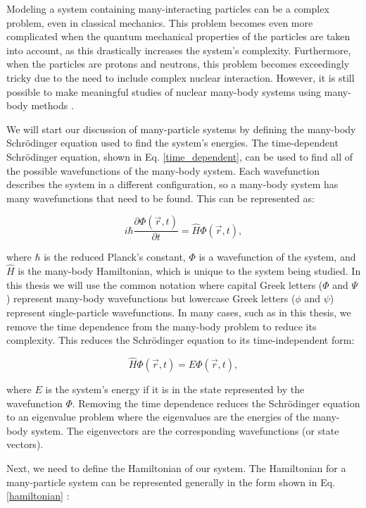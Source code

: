 Modeling a system containing many-interacting particles can be a complex problem, even in classical mechanics. This problem becomes even more complicated when the quantum mechanical properties of the particles are taken into account, as this drastically increases the system's complexity. Furthermore, when the particles are protons and neutrons, this problem becomes exceedingly tricky due to the need to include complex nuclear interaction. However, it is still possible to make meaningful studies of nuclear many-body systems using many-body methods \cite{Ref13}.

We will start our discussion of many-particle systems by defining the many-body Schr\"{o}dinger equation used to find the system's energies. The time-dependent Schr\"{o}dinger equation, shown in Eq. \ref{time_dependent}, can be used to find all of the possible wavefunctions of the many-body system. Each wavefunction describes the system in a different configuration, so a many-body system has many wavefunctions that need to be found. This can be represented as:

\begin{equation} \label{time_dependent}
	i\hbar \frac{\partial \Phi(\vec{r}, t)}{\partial t} = \hat{H}\Phi(\vec{r}, t),
\end{equation}

where $\hbar$ is the reduced Planck's constant, $\Phi$ is a wavefunction of the system, and $\hat{H}$ is the many-body Hamiltonian, which is unique to the system being studied. In this thesis we will use the common notation where capital Greek letters ($\Phi$ and $\Psi$) represent many-body wavefunctions but lowercase Greek letters ($\phi$ and $\psi$) represent single-particle wavefunctions. In many cases, such as in this thesis, we remove the time dependence from the many-body problem to reduce its complexity. This reduces the Schr\"{o}dinger equation to its time-independent form:

\begin{equation} \label{time_independent}
	\hat{H}\Phi(\vec{r}, t) = E\Phi(\vec{r}, t),
\end{equation}

where $E$ is the system's energy if it is in the state represented by the wavefunction $\Phi$. Removing the time dependence reduces the Schr\"{o}dinger equation to an eigenvalue problem where the eigenvalues are the energies of the many-body system. The eigenvectors are the corresponding wavefunctions (or state vectors).

Next, we need to define the Hamiltonian of our system. The Hamiltonian for a many-particle system can be represented generally in the form shown in Eq. \ref{hamiltonian} \cite{Ref8}:

